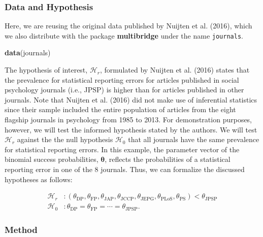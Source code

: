 \documentclass[
  english,
  man,floatsintext]{apa6}
\newenvironment{Shaded}{\begin{snugshade}}{\end{snugshade}}
\newcommand{\KeywordTok}[1]{\textcolor[rgb]{0.13,0.29,0.53}{\textbf{#1}}}
\newcommand{\NormalTok}[1]{#1}
\begin{document}
\hypertarget{data-and-hypothesis-1}{%
\subsubsection{Data and Hypothesis}\label{data-and-hypothesis-1}}

Here, we are reusing the original data published by Nuijten et al. (2016), which we also distribute with the package \textbf{multibridge} under the name \texttt{journals}.

\begin{Shaded}
\begin{Highlighting}[]
\KeywordTok{data}\NormalTok{(journals)}
\end{Highlighting}
\end{Shaded}

The hypothesis of interest, \(\mathcal{H}_r\), formulated by Nuijten et al. (2016) states that the prevalence for statistical reporting errors for articles published in social psychology journals (i.e., JPSP) is higher than for articles published in other journals. Note that Nuijten et al. (2016) did not make use of inferential statistics since their sample included the entire population of articles from the eight flagship journals in psychology from 1985 to 2013. For demonstration purposes, however, we will test the informed hypothesis stated by the authors. We will test \(\mathcal{H}_r\) against the the null hypothesis \(\mathcal{H}_0\) that all journals have the same prevalence for statistical reporting errors. In this example, the parameter vector of the binomial success probabilities, \(\boldsymbol{\theta}\), reflects the probabilities of a statistical reporting error in one of the 8 journals. Thus, we can formalize the discussed hypotheses as follows:

\begin{align*}
    \mathcal{H}_r &: (\theta_{\text{DP}}, \theta_{\text{FP}}, \theta_{\text{JAP}} , \theta_{\text{JCCP}} , \theta_{\text{JEPG}} , \theta_{\text{PLoS}}, \theta_{\text{PS}}) < \theta_{\text{JPSP}} \\
    \mathcal{H}_0 &: \theta_{\text{DP}} =  \theta_{\text{FP}} =  \cdots = \theta_{\text{JPSP}}.
\end{align*}

\hypertarget{method-1}{%
\subsubsection{Method}\label{method-1}}
\end{document}
